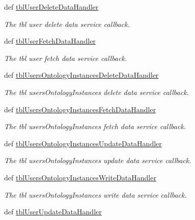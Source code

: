 \begin{DoxyCompactItemize}
def \hyperlink{classmysql__wrapper__old_1_1MySQLdbWrapper_ac18d93a981d084fda7a4fc105ce3fe1c}{tbl\-User\-Delete\-Data\-Handler}
\begin{DoxyCompactList}\small\item\em The tbl user delete data service callback. \end{DoxyCompactList}\item 
def \hyperlink{classmysql__wrapper__old_1_1MySQLdbWrapper_aa02f8bd233224eabc3135b17c6b6be61}{tbl\-User\-Fetch\-Data\-Handler}
\begin{DoxyCompactList}\small\item\em The tbl user fetch data service callback. \end{DoxyCompactList}\item 
def \hyperlink{classmysql__wrapper__old_1_1MySQLdbWrapper_ae2103187a42c88c69ec947794ea2ac19}{tbl\-Users\-Ontology\-Instances\-Delete\-Data\-Handler}
\begin{DoxyCompactList}\small\item\em The tbl users\-Ontology\-Instances delete data service callback. \end{DoxyCompactList}\item 
def \hyperlink{classmysql__wrapper__old_1_1MySQLdbWrapper_a4c7a14432d8b1504e4a9f33de3d82221}{tbl\-Users\-Ontology\-Instances\-Fetch\-Data\-Handler}
\begin{DoxyCompactList}\small\item\em The tbl users\-Ontology\-Instances fetch data service callback. \end{DoxyCompactList}\item 
def \hyperlink{classmysql__wrapper__old_1_1MySQLdbWrapper_ace9c9c469845c42b0bc23e9dfee70a9b}{tbl\-Users\-Ontology\-Instances\-Update\-Data\-Handler}
\begin{DoxyCompactList}\small\item\em The tbl users\-Ontology\-Instances update data service callback. \end{DoxyCompactList}\item 
def \hyperlink{classmysql__wrapper__old_1_1MySQLdbWrapper_afff1602ed90f3f7c32c4c810be2fea39}{tbl\-Users\-Ontology\-Instances\-Write\-Data\-Handler}
\begin{DoxyCompactList}\small\item\em The tbl users\-Ontology\-Instances write data service callback. \end{DoxyCompactList}\item 
def \hyperlink{classmysql__wrapper__old_1_1MySQLdbWrapper_a1dc8f85c1d034feed10bfc644387578f}{tbl\-User\-Update\-Data\-Handler}

\end{DoxyCompactItemize}
